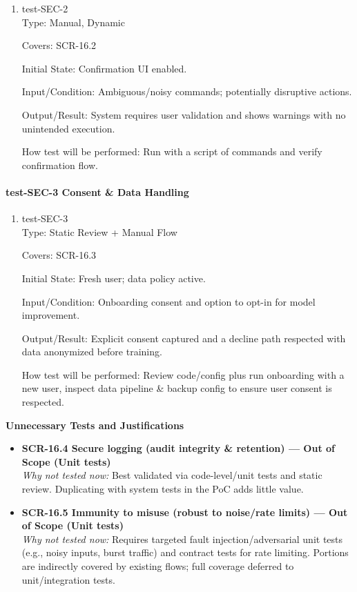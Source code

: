 \documentclass[12pt, titlepage]{article}
\begin{document}
\begin{enumerate}
\item{test-SEC-2\\}
Type: Manual, Dynamic

Covers: SCR-16.2

Initial State: Confirmation UI enabled.

Input/Condition: Ambiguous/noisy commands; potentially disruptive actions.

Output/Result: System requires user validation and shows warnings with no unintended execution.

How test will be performed: Run with a script of commands and verify confirmation flow.
\end{enumerate}

\paragraph{test-SEC-3 Consent \& Data Handling}

\begin{enumerate}
\item{test-SEC-3\\}
Type: Static Review + Manual Flow

Covers: SCR-16.3

Initial State: Fresh user; data policy active.

Input/Condition: Onboarding consent and option to opt-in for model improvement.

Output/Result: Explicit consent captured and a decline path respected with data anonymized before training.

How test will be performed: Review code/config plus run onboarding with a new user, inspect data pipeline \& backup config to ensure user consent is respected.
\end{enumerate}

\noindent\textbf{Unnecessary Tests and Justifications}
\begin{itemize}
\item \textbf{SCR-16.4 Secure logging (audit integrity \& retention) — Out of Scope (Unit tests)}\\
\emph{Why not tested now:} Best validated via code-level/unit tests and static review. Duplicating with system tests in the PoC adds little value.
\item \textbf{SCR-16.5 Immunity to misuse (robust to noise/rate limits) — Out of Scope (Unit tests)}\\
\emph{Why not tested now:} Requires targeted fault injection/adversarial unit tests (e.g., noisy inputs, burst traffic) and contract tests for rate limiting. Portions are indirectly covered by existing flows; full coverage deferred to unit/integration tests.
\end{itemize}
\end{document}
